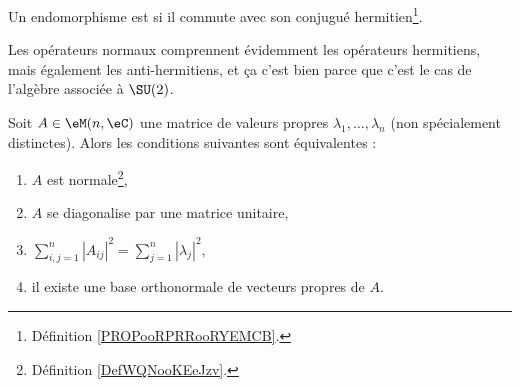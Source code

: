 \begin{definition}  \label{DefWQNooKEeJzv}
	Un endomorphisme est  si il commute avec son conjugué hermitien\footnote{Définition \ref{PROPooRPRRooRYEMCB}.}.
\end{definition}

Les opérateurs normaux comprennent évidemment les opérateurs hermitiens, mais également les anti-hermitiens, et ça c'est bien parce que c'est le cas de l'algèbre associée à \( \SU(2)\).

\begin{theorem}    \label{ThogammwA}
	Soit \( A\in\eM(n,\eC)\) une matrice de valeurs propres \( \lambda_1,\ldots, \lambda_n\) (non spécialement distinctes). Alors les conditions suivantes sont équivalentes :
	\begin{enumerate}
		\item   \label{ItemJZhFPSi}
		      \( A\) est normale\footnote{Définition \ref{DefWQNooKEeJzv}.},
		\item   \label{ItemJZhFPSii}
		      \( A\) se diagonalise par une matrice unitaire,
		\item   \label{ITEMooIIQTooQORrXP}
		      \( \sum_{i,j=1}^n| A_{ij} |^2=\sum_{j=1}^n| \lambda_j |^2\),
		\item   \label{ITEMooJRKSooNfsQJb}
		      il existe une base orthonormale de vecteurs propres de \( A\).
	\end{enumerate}
\end{theorem}

